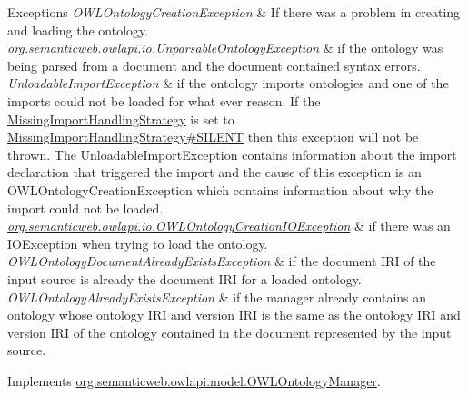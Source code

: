 \begin{DoxyExceptions}{Exceptions}
{\em O\-W\-L\-Ontology\-Creation\-Exception} & If there was a problem in creating and loading the ontology. \\
\hline
{\em \hyperlink{classorg_1_1semanticweb_1_1owlapi_1_1io_1_1_unparsable_ontology_exception}{org.\-semanticweb.\-owlapi.\-io.\-Unparsable\-Ontology\-Exception}} & if the ontology was being parsed from a document and the document contained syntax errors. \\
\hline
{\em Unloadable\-Import\-Exception} & if the ontology imports ontologies and one of the imports could not be loaded for what ever reason. If the \hyperlink{}{Missing\-Import\-Handling\-Strategy} is set to \hyperlink{enumorg_1_1semanticweb_1_1owlapi_1_1model_1_1_missing_import_handling_strategy_aed66060ec95dc4ad59ca4dd82509782b}{Missing\-Import\-Handling\-Strategy\#\-S\-I\-L\-E\-N\-T} then this exception will not be thrown. The {\ttfamily Unloadable\-Import\-Exception} contains information about the import declaration that triggered the import and the cause of this exception is an {\ttfamily O\-W\-L\-Ontology\-Creation\-Exception} which contains information about why the import could not be loaded. \\
\hline
{\em \hyperlink{classorg_1_1semanticweb_1_1owlapi_1_1io_1_1_o_w_l_ontology_creation_i_o_exception}{org.\-semanticweb.\-owlapi.\-io.\-O\-W\-L\-Ontology\-Creation\-I\-O\-Exception}} & if there was an {\ttfamily I\-O\-Exception} when trying to load the ontology. \\
\hline
{\em O\-W\-L\-Ontology\-Document\-Already\-Exists\-Exception} & if the document I\-R\-I of the input source is already the document I\-R\-I for a loaded ontology. \\
\hline
{\em O\-W\-L\-Ontology\-Already\-Exists\-Exception} & if the manager already contains an ontology whose ontology I\-R\-I and version I\-R\-I is the same as the ontology I\-R\-I and version I\-R\-I of the ontology contained in the document represented by the input source. \\
\hline
\end{DoxyExceptions}


Implements \hyperlink{interfaceorg_1_1semanticweb_1_1owlapi_1_1model_1_1_o_w_l_ontology_manager_aad9b6653292ab344f84ecdaf00fdfe24}{org.\-semanticweb.\-owlapi.\-model.\-O\-W\-L\-Ontology\-Manager}.

